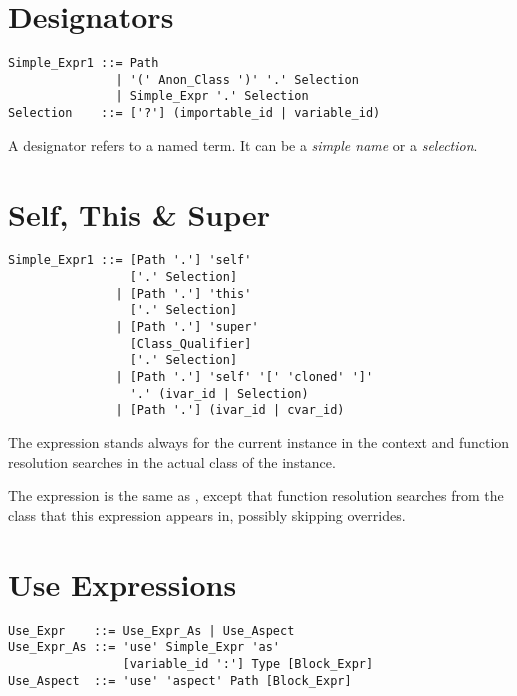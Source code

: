 \section{Designators}
\label{sec:designators}

\syntax\begin{lstlisting}
Simple_Expr1 ::= Path
               | '(' Anon_Class ')' '.' Selection
               | Simple_Expr '.' Selection
Selection    ::= ['?'] (importable_id | variable_id)
\end{lstlisting}

A designator refers to a named term. It can be a {\em simple name} or a {\em selection}.






\section{Self, This \& Super}
\label{sec:self-this-super}

\syntax\begin{lstlisting}
Simple_Expr1 ::= [Path '.'] 'self'
                 ['.' Selection]
               | [Path '.'] 'this'
                 ['.' Selection]
               | [Path '.'] 'super' 
                 [Class_Qualifier] 
                 ['.' Selection]
               | [Path '.'] 'self' '[' 'cloned' ']'
                 '.' (ivar_id | Selection)
               | [Path '.'] (ivar_id | cvar_id)
\end{lstlisting}

The expression  stands always for the current instance in the context and function resolution searches in the actual class of the instance. 

The expression  is the same as , except that function resolution searches from the class that this expression appears in, possibly skipping overrides. 







\section{Use Expressions}
\label{sec:use-expressions}

\syntax\begin{lstlisting}
Use_Expr    ::= Use_Expr_As | Use_Aspect
Use_Expr_As ::= 'use' Simple_Expr 'as' 
                [variable_id ':'] Type [Block_Expr]
Use_Aspect  ::= 'use' 'aspect' Path [Block_Expr]
\end{lstlisting}

